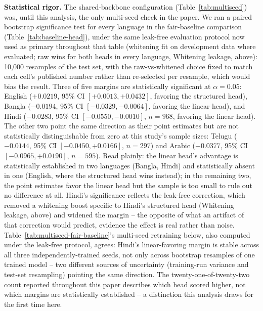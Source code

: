 \documentclass[manuscript]{acmart}
\begin{document}
\textbf{Statistical rigor.} The shared-backbone configuration (Table~\ref{tab:multiseed}) was, until this analysis, the only multi-seed check in the paper. We ran a paired bootstrap significance test for every language in the fair-baseline comparison (Table~\ref{tab:baseline-head}), under the same leak-free evaluation protocol now used as primary throughout that table (whitening fit on development data where evaluated; raw wins for both heads in every language, Whitening leakage, above): 10,000 resamples of the test set, with the raw-vs-whitened choice fixed to match each cell's published number rather than re-selected per resample, which would bias the result. Three of five margins are statistically significant at $\alpha=0.05$: English ($+0.0219$, 95\% CI $[+0.0013, +0.0432]$, favoring the structured head), Bangla ($-0.0194$, 95\% CI $[-0.0329, -0.0064]$, favoring the linear head), and Hindi ($-0.0283$, 95\% CI $[-0.0550, -0.0010]$, $n=968$, favoring the linear head). The other two point the same direction as their point estimates but are not statistically distinguishable from zero at this study's sample sizes: Telugu ($-0.0144$, 95\% CI $[-0.0450, +0.0166]$, $n=297$) and Arabic ($-0.0377$, 95\% CI $[-0.0965, +0.0190]$, $n=595$). Read plainly: the linear head's advantage is statistically established in two languages (Bangla, Hindi) and statistically absent in one (English, where the structured head wins instead); in the remaining two, the point estimates favor the linear head but the sample is too small to rule out no difference at all. Hindi's significance reflects the leak-free correction, which removed a whitening boost specific to Hindi's structured head (Whitening leakage, above) and widened the margin -- the opposite of what an artifact of that correction would predict, evidence the effect is real rather than noise. Table~\ref{tab:multiseed-fair-baseline}'s multi-seed retraining below, also computed under the leak-free protocol, agrees: Hindi's linear-favoring margin is stable across all three independently-trained seeds, not only across bootstrap resamples of one trained model -- two different sources of uncertainty (training-run variance and test-set resampling) pointing the same direction. The twenty-one-of-twenty-two count reported throughout this paper describes which head scored higher, not which margins are statistically established -- a distinction this analysis draws for the first time here.
\end{document}
